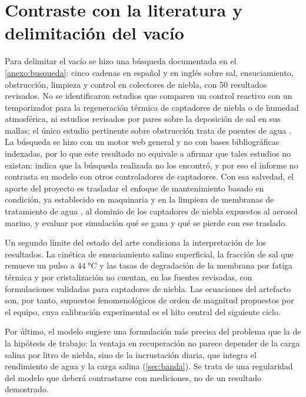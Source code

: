 \section{Contraste con la literatura y delimitaci\'on del vac\'io}
\label{sec:vacio}
Para delimitar el vac\'io se hizo una b\'usqueda documentada en el \cref{anexo:busqueda}: cinco cadenas en espa\~nol y en ingl\'es sobre sal, ensuciamiento, obstrucci\'on, limpieza y control en colectores de niebla, con 50 resultados revisados. No se identificaron estudios que comparen un control reactivo con un temporizador para la regeneraci\'on t\'ermica de captadores de niebla o de humedad atmosf\'erica, ni estudios revisados por pares sobre la deposici\'on de sal en sus mallas; el \'unico estudio pertinente sobre obstrucci\'on trata de puentes de agua \parencite{park2021clogged}. La b\'usqueda se hizo con un motor web general y no con bases bibliogr\'aficas indexadas, por lo que este resultado no equivale a afirmar que tales estudios no existan: indica que la b\'usqueda realizada no los encontr\'o, y por eso el informe no contrasta su modelo con otros controladores de captadores. Con esa salvedad, el aporte del proyecto es trasladar el enfoque de mantenimiento basado en condici\'on, ya establecido en maquinaria y en la limpieza de membranas de tratamiento de agua \parencite{jardine2006review,comas2010knowledge,ferrero2011knowledge}, al dominio de los captadores de niebla expuestos al aerosol marino, y evaluar por simulaci\'on qu\'e se gana y qu\'e se pierde con ese traslado.

Un segundo l\'imite del estado del arte condiciona la interpretaci\'on de los resultados. La cin\'etica de ensuciamiento salino superficial, la fracci\'on de sal que remueve un pulso a $44\;\si{\celsius}$ y las tasas de degradaci\'on de la membrana por fatiga t\'ermica y por cristalizaci\'on no cuentan, en las fuentes revisadas, con formulaciones validadas para captadores de niebla. Las ecuaciones del artefacto son, por tanto, supuestos fenomenol\'ogicos de orden de magnitud propuestos por el equipo, cuya calibraci\'on experimental es el hito central del siguiente ciclo.

Por \'ultimo, el modelo sugiere una formulaci\'on m\'as precisa del problema que la de la hip\'otesis de trabajo: la ventaja en recuperaci\'on no parece depender de la carga salina por litro de niebla, sino de la incrustaci\'on diaria, que integra el rendimiento de agua y la carga salina (\cref{sec:banda}). Se trata de una regularidad del modelo que deber\'a contrastarse con mediciones, no de un resultado demostrado.

